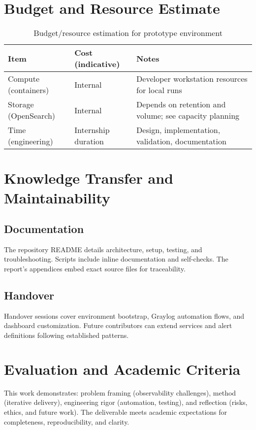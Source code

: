 \documentclass[12pt,a4paper]{report}
\begin{document}
\chapter{Budget and Resource Estimate}
\begin{table}[H]
\centering
\begin{tabular}{p{5cm} p{4cm} p{6cm}}
\toprule
\textbf{Item} & \textbf{Cost (indicative)} & \textbf{Notes} \\
\midrule
Compute (containers) & Internal & Developer workstation resources for local runs \\
Storage (OpenSearch) & Internal & Depends on retention and volume; see capacity planning \\
Time (engineering) & Internship duration & Design, implementation, validation, documentation \\
\bottomrule
\end{tabular}
\caption{Budget/resource estimation for prototype environment}
\end{table}

\chapter{Knowledge Transfer and Maintainability}
\section{Documentation}
The repository README details architecture, setup, testing, and troubleshooting. Scripts include inline documentation and self-checks. The report’s appendices embed exact source files for traceability.

\section{Handover}
Handover sessions cover environment bootstrap, Graylog automation flows, and dashboard customization. Future contributors can extend services and alert definitions following established patterns.

\chapter{Evaluation and Academic Criteria}
This work demonstrates: problem framing (observability challenges), method (iterative delivery), engineering rigor (automation, testing), and reflection (risks, ethics, and future work). The deliverable meets academic expectations for completeness, reproducibility, and clarity.
\end{document}
